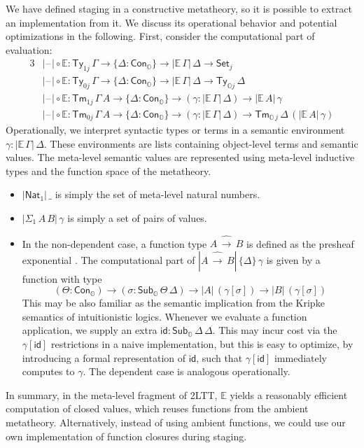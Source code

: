 \documentclass[acmsmall]{acmart}
\newcommand{\msf}[1]{\mathsf{#1}}
\newcommand{\mbb}[1]{\mathbb{#1}}
\newcommand{\wh}[1]{\widehat{#1}}
\newcommand{\mbbo}{\mbb{O}}
\newcommand{\Ty}{\msf{Ty}}
\newcommand{\Tm}{\msf{Tm}}
\newcommand{\Cono}{\msf{Con}_{\mbbo}}
\newcommand{\Subo}{\msf{Sub}_{\mbbo}}
\newcommand{\Nat}{\msf{Nat}}
\newcommand{\id}{\msf{id}}
\newcommand{\Set}{\mathsf{Set}}
\newcommand{\blank}{{\mathord{\hspace{1pt}\text{--}\hspace{1pt}}}}
\newcommand{\ev}{\mbb{E}}
\theoremstyle{remark}
\begin{document}
We have defined staging in a constructive metatheory, so it is possible to
extract an implementation from it. We discuss its operational behavior and
potential optimizations in the following. First, consider the computational
part of evaluation:
\begin{alignat*}{3}
  & |\blank| \circ \ev : \Ty_{1 j}\,\Gamma \to \{\Delta : \Cono\} \to |\ev\,\Gamma|\,\Delta \to \Set_j\\
  & |\blank| \circ \ev : \Ty_{0 j}\,\Gamma \to \{\Delta : \Cono\} \to |\ev\,\Gamma|\,\Delta \to \Ty_{\mbbo j}\,\Delta\\
  & |\blank| \circ \ev : \Tm_{1 j}\,\Gamma\,A \to \{\Delta : \Cono\} \to (\gamma : |\ev\,\Gamma|\,\Delta) \to
    |\ev\,A|\,\gamma \\
  & |\blank| \circ \ev : \Tm_{0 j}\,\Gamma\,A \to \{\Delta : \Cono\} \to (\gamma : |\ev\,\Gamma|\,\Delta) \to
    \Tm_{\mbbo\,j}\,\Delta\,(|\ev\,A|\,\gamma)
\end{alignat*}
Operationally, we interpret syntactic types or terms in a semantic environment
$\gamma : |\ev\,\Gamma|\,\Delta$. These environments are lists containing
object-level terms and semantic values. The meta-level semantic values are
represented using meta-level inductive types and the function space of the
metatheory.
\begin{itemize}
  \item $|\Nat_1|\,\_$ is simply the set of meta-level natural numbers.
  \item $|\Sigma_1\,A\,B|\,\gamma$ is simply a set of pairs of values.
  \item In the non-dependent case, a function type $A\,\wh{\to}\,B$ is defined as the presheaf
        exponential \cite{TODO}. The computational part of $|A\,\wh{\to}\,B|\,\{\Delta\}\,\gamma$
        is given by a function with type
        \[ (\Theta : \Cono) \to (\sigma : \Subo\,\Theta\,\Delta) \to |A|\,(\gamma[\sigma]) \to |B|\,(\gamma[\sigma])        \]
        This may be also familiar as the semantic implication from the Kripke
        semantics of intuitionistic logics. Whenever we evaluate a function
        application, we supply an extra $\id : \Subo\,\Delta\,\Delta$. This may
        incur cost via the $\gamma[\id]$ restrictions in a naive
        implementation, but this is easy to optimize, by introducing a formal
        representation of $\id$, such that $\gamma[\id]$ immediately computes to
        $\gamma$. The dependent case is analogous operationally.
\end{itemize}
In summary, in the meta-level fragment of 2LTT, $\ev$ yields a reasonably efficient
computation of closed values, which reuses functions from the ambient
metatheory. Alternatively, instead of using ambient functions, we could use our
own implementation of function closures during staging.
\end{document}
